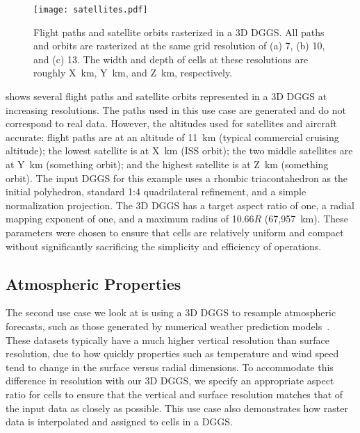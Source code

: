 \begin{figure}[ht!]
	\centering
	\texttt{[image: satellites.pdf]}
	\caption[Flight path and satellite orbit use case showing several sample trajectories]{
		Flight paths and satellite orbits rasterized in a 3D DGGS.
		All paths and orbits are rasterized at the same grid resolution of (a) 7, (b) 10, and (c) 13.
		The width and depth of cells at these resolutions are roughly X~km, Y~km, and Z~km, respectively.
	}
	\label{fig:satellites}
\end{figure}


 shows several flight paths and satellite orbits represented in a 3D DGGS at increasing resolutions.
The paths used in this use case are generated and do not correspond to real data.
However, the altitudes used for satellites and aircraft  accurate:
flight paths are at an altitude of 11~km (typical commercial cruising altitude); the lowest satellite is at X~km (ISS orbit); the two middle satellites are at Y~km (something orbit); and the highest satellite is at Z~km (something orbit).  
The input DGGS for this example uses a rhombic triacontahedron as the initial polyhedron, standard 1:4 quadrilateral refinement, and a simple normalization projection.
The 3D DGGS has a target aspect ratio of one, a radial mapping exponent of one, and a maximum radius of 10.66$R$ (67,957~km).
These parameters were chosen to ensure that cells are relatively uniform and compact without significantly sacrificing the simplicity and efficiency of operations.


\subsection{Atmospheric Properties}
The second use case we look at is using a 3D DGGS to resample atmospheric forecasts, such as those generated by numerical weather prediction models~\cite{ncepncar, era5}.
These datasets typically have a much higher vertical resolution than surface resolution, due to how quickly properties such as temperature and wind speed tend to change in the surface versus radial dimensions.
To accommodate this difference in resolution with our 3D DGGS, we specify an appropriate aspect ratio for cells to ensure that the vertical and surface resolution matches that of the input data as closely as possible.
This use case also demonstrates how raster data is interpolated and assigned to cells in a DGGS. 


